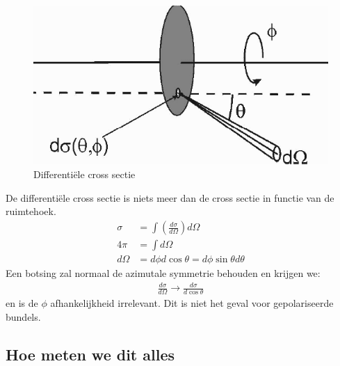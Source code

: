 \documentclass[../main.tex]{subfiles}
\begin{document}
\begin{figure}[h]
    \centering
    \includegraphics[width=0.8\linewidth]{introduction_and_review/dif_cross_sec.png}
    \caption{Differentiële cross sectie}%
    \label{fig:dif_cross_sec}
\end{figure}

De differentiële cross sectie is niets meer dan de cross sectie in functie van de ruimtehoek.
\begin{equation}
    \begin{aligned}
        \label{eq:dif_cross_sec}
        \sigma&=\int \left(\frac{d\sigma}{d\Omega}\right)d\Omega\\
        4\pi&=\int d\Omega\\
        d\Omega &= d\phi d\cos\theta = d\phi\sin\theta d\theta
    \end{aligned}
\end{equation}
Een botsing zal normaal de azimutale symmetrie behouden en krijgen we:
\begin{equation}
    \begin{aligned}
        \label{eq:dif_cross_sec_az_sym}
        \frac{d\sigma}{d\Omega}\rightarrow \frac{d\sigma}{d\cos\theta}
    \end{aligned}
\end{equation}
en is de $\phi$ afhankelijkheid irrelevant. Dit is niet het geval voor gepolariseerde bundels.\\

\subsection{Hoe meten we dit alles}%
\label{sub:hoe_meten_we_dit_alles}
\end{document}
